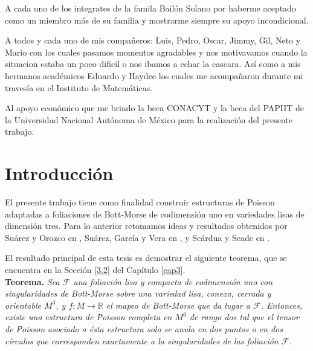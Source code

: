 \documentclass[a4paper,10pt]{book}
\begin{document}
\par A cada uno de los integrates de la famila Bail\'on Solano por haberme aceptado como un miembro m\'as de su familia y mostrarme siempre su apoyo incondicional.\\

\par A todos y cada uno de mis compa\~{n}eros: Luis, Pedro, Oscar, Jimmy, Gil, Neto y Mario con los cuales pasamos momentos agradables y nos motivavamos cuando la situacion estaba un poco dificil o nos ibamos a echar la cascara. As\'i como a mis hermanos acad\'emicos Eduardo y Haydee los cuales me acompa\~{n}aron durante mi traves\'ia en el Instituto de Matem\'aticas.\\

\par Al apoyo econ\'omico que me brindo la beca CONACYT y la beca del PAPIIT de la Universidad Nacional Aut\'onoma de M\'exico para la realizaci\'on del presente trabajo. \newline
{}\newline
{}                

\tableofcontents

\chapter*{Introducci\'on}
   
El presente trabajo tiene como finalidad construir estructuras de Poisson adaptadas a foliaciones de Bott-Morse de codimensi\'on uno en variedades lisas de dimensi\'on tres. Para lo anterior retomamos ideas y resultados obtenidos por Su\'arez y Orozco en \cite{SO}, Su\'arez, Garc\'ia y Vera en \cite{GSV}, y Sc\'ardua y Seade en \cite{Seade1}.
\vspace{5mm}

El resultado principal de esta tesis es demostrar el siguiente teorema, que se encuentra en la Secci\'on \ref{3.2} del Cap\'itulo \ref{cap3}.\\

\textbf{Teorema.} \textit{Sea $\mathcal{F}$ una foliaci\'on lisa y compacta de codimensi\'on uno con singularidades de Bott-Morse sobre una variedad lisa, conexa, cerrada y orientable $M^{3}$, y $f:M\to\mathbb{R}$ el mapeo de Bott-Morse que da lugar a $\mathcal{F}$. Entonces, existe una estructura de Poisson completa en $M^{3}$ de rango dos tal que el tensor de Poisson asociado a \'esta estructura solo se anula en dos puntos o en dos c\'irculos que corresponden exactamente a la singularidades de las foliaci\'on $\mathcal{F}$.}\\
 
\end{document}
